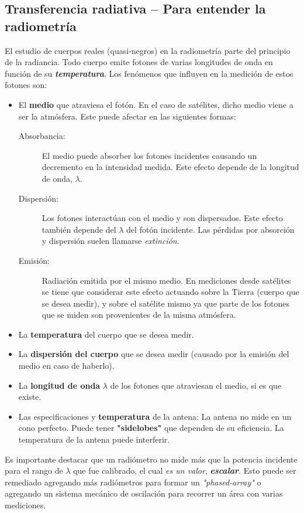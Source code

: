 \documentclass[11pt,titlepage]{article}
\begin{document}
\subsection[Teoría de transferencia radiativa]{Transferencia radiativa -- Para entender la radiometría}
\label{sec:teoria_radiometria}
El estudio de cuerpos reales (quasi-negros) en la radiometría parte del principio de la radiancia. Todo cuerpo emite fotones de varias longitudes de onda en función de su \textbf{\emph{temperatura}}. Los fenómenos que influyen en la medición de estos fotones son:
\begin{itemize}
    \item El \textbf{medio} que atraviesa el fotón. En el caso de satélites, dicho medio viene a ser la atmósfera. Este puede afectar en las siguientes formas:
    \begin{description}
        \item[Absorbancia:] El medio puede absorber los fotones incidentes causando un decremento en la intensidad medida. Este efecto depende de la longitud de onda, $\lambda$.
        \item[Dispersión:] Los fotones interactúan con el medio y son dispersados. Este efecto tambi\'en depende del $\lambda$ del fotón incidente. Las pérdidas por absorción y dispersión suelen llamarse \textit{extinción}.
        \item[Emisión:] Radiación emitida por el mismo medio. En mediciones desde satélites se tiene que considerar este efecto actuando sobre la Tierra (cuerpo que se desea medir), y sobre el satélite mismo ya que parte de los fotones que se miden son provenientes de la misma atmósfera.
    \end{description}
    \item La \textbf{temperatura} del cuerpo que se desea medir.
    \item La \textbf{dispersión del cuerpo} que se desea medir (causado por la emisión del medio en caso de haberlo).
    \item La \textbf{longitud de onda} $\lambda$ de los fotones que atraviesan el medio, si es que existe.
    \item Las especificaciones y \textbf{temperatura} de la antena: La antena no mide en un cono perfecto. Puede tener \textbf{"sidelobes"} que dependen de su eficiencia. La temperatura de la antena puede interferir.
\end{itemize}

Es importante destacar que un radiómetro no mide más que la potencia incidente para el rango de $\lambda$ que fue calibrado, el cual \textit{es un valor}, \textbf{\emph{escalar}}. Esto puede ser remediado agregando más radiómetros para formar un \textit{"phased-array"} o agregando un sistema mecánico de oscilación para recorrer un área con varias mediciones. 
\end{document}
